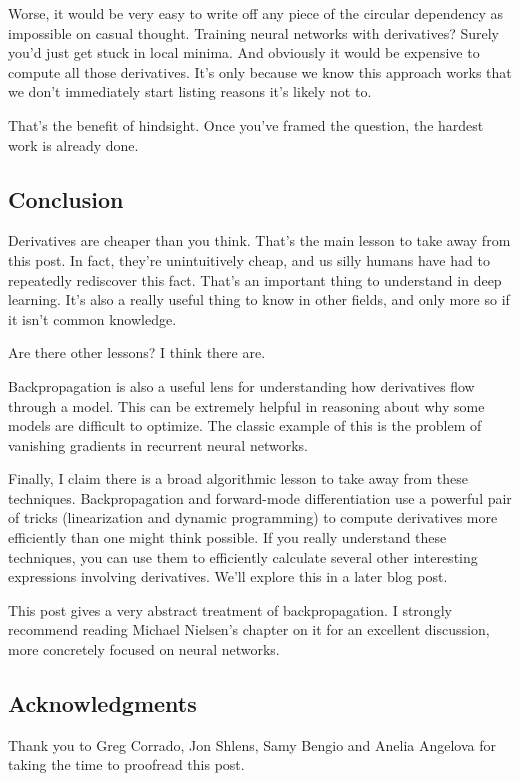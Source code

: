 \documentclass[a4paper,12pt]{report}%
\begin{document}
Worse, it would be very easy to write off any piece of the circular dependency as impossible on casual thought. Training neural networks with derivatives? Surely you’d just get stuck in local minima. And obviously it would be expensive to compute all those derivatives. It’s only because we know this approach works that we don’t immediately start listing reasons it’s likely not to.

That’s the benefit of hindsight. Once you’ve framed the question, the hardest work is already done.

\subsection{Conclusion}

Derivatives are cheaper than you think. That’s the main lesson to take away from this post. In fact, they’re unintuitively cheap, and us silly humans have had to repeatedly rediscover this fact. That’s an important thing to understand in deep learning. It’s also a really useful thing to know in other fields, and only more so if it isn’t common knowledge.

Are there other lessons? I think there are.

Backpropagation is also a useful lens for understanding how derivatives flow through a model. This can be extremely helpful in reasoning about why some models are difficult to optimize. The classic example of this is the problem of vanishing gradients in recurrent neural networks.

Finally, I claim there is a broad algorithmic lesson to take away from these techniques. Backpropagation and forward-mode differentiation use a powerful pair of tricks (linearization and dynamic programming) to compute derivatives more efficiently than one might think possible. If you really understand these techniques, you can use them to efficiently calculate several other interesting expressions involving derivatives. We’ll explore this in a later blog post.

This post gives a very abstract treatment of backpropagation. I strongly recommend reading Michael Nielsen’s chapter on it for an excellent discussion, more concretely focused on neural networks.

\subsection*{Acknowledgments}

Thank you to Greg Corrado, Jon Shlens, Samy Bengio and Anelia Angelova for taking the time to proofread this post.
\end{document}
